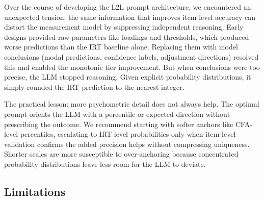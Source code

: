 \documentclass[
  man,
  floatsintext,
  longtable,
  nolmodern,
  notxfonts,
  notimes,
  colorlinks=true,linkcolor=blue,citecolor=blue,urlcolor=blue]{apa7}
\begin{document}
Over the course of developing the L2L prompt architecture, we
encountered an unexpected tension: the same information that improves
item-level accuracy can distort the measurement model by suppressing
independent reasoning. Early designs provided raw parameters like
loadings and thresholds, which produced worse predictions than the IRT
baseline alone. Replacing them with model conclusions (modal
predictions, confidence labels, adjustment directions) resolved this and
enabled the monotonic tier improvement. But when conclusions were too
precise, the LLM stopped reasoning. Given explicit probability
distributions, it simply rounded the IRT prediction to the nearest
integer.

The practical lesson: more psychometric detail does not always help. The
optimal prompt orients the LLM with a percentile or expected direction
without prescribing the outcome. We recommend starting with softer
anchors like CFA-level percentiles, escalating to IRT-level
probabilities only when item-level validation confirms the added
precision helps without compressing uniqueness. Shorter scales are more
susceptible to over-anchoring because concentrated probability
distributions leave less room for the LLM to deviate.

\subsection{Limitations}\label{limitations}
\end{document}
